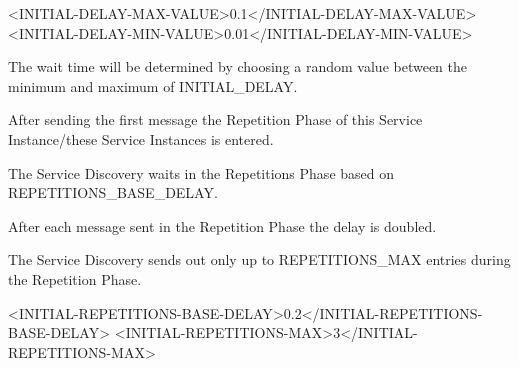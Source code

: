 \begin{DoxyCode}
<\textcolor{keywordtype}{INITIAL-DELAY-MAX-VALUE}>0.1</\textcolor{keywordtype}{INITIAL-DELAY-MAX-VALUE}>
<\textcolor{keywordtype}{INITIAL-DELAY-MIN-VALUE}>0.01</\textcolor{keywordtype}{INITIAL-DELAY-MIN-VALUE}>
\end{DoxyCode}

\begin{DoxyItemize}
\item The wait time will be determined by choosing a random value between the minimum and maximum of I\+N\+I\+T\+I\+A\+L\+\_\+\+D\+E\+L\+AY.
\item After sending the first message the Repetition Phase of this Service Instance/these Service Instances is entered.
\item The Service Discovery waits in the Repetitions Phase based on R\+E\+P\+E\+T\+I\+T\+I\+O\+N\+S\+\_\+\+B\+A\+S\+E\+\_\+\+D\+E\+L\+AY.
\item After each message sent in the Repetition Phase the delay is doubled.
\item The Service Discovery sends out only up to R\+E\+P\+E\+T\+I\+T\+I\+O\+N\+S\+\_\+\+M\+AX entries during the Repetition Phase.
\end{DoxyItemize}


\begin{DoxyCode}
<\textcolor{keywordtype}{INITIAL-REPETITIONS-BASE-DELAY}>0.2</\textcolor{keywordtype}{INITIAL-REPETITIONS-BASE-DELAY}>
<\textcolor{keywordtype}{INITIAL-REPETITIONS-MAX}>3</\textcolor{keywordtype}{INITIAL-REPETITIONS-MAX}>
\end{DoxyCode}

